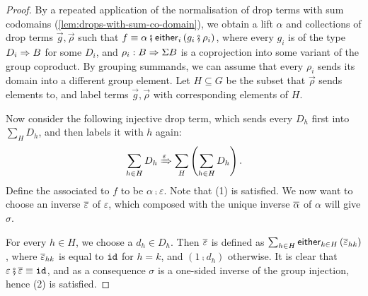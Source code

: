 \begin{proof}
    By a repeated application of the normalisation of drop terms with sum codomains (\cref{lem:drops-with-sum-co-domain}), we obtain a lift $\alpha$ and collections of drop terms $\vec g, \vec \rho$ such that $f \equiv \alpha \comp \eithermany{i}{(g_i \comp \rho_i)}$, where every $g_i$ is of the type $D_i \Rightarrow B$ for some $D_i$, and $\rho_i : B \Rightarrow \Sigma B$ is a coprojection into some variant of the group coproduct. By grouping summands, we can assume that every $\rho_i$ sends its domain into a different group element. Let $H \subseteq G$ be the subset that $\vec \rho$ sends elements to, and label terms $\vec g, \vec \rho$ with corresponding elements of $H$. 

    Now consider the following injective drop term, which sends every $D_h$ first into $\sum_H D_h$, and then labels it with $h$ again:
    \[
        \sum_{h \in H} D_h \xRightarrow{\varepsilon} \sum_H \left( \sum_{h \in H} D_h \right).
    \]  
    Define the  associated to $f$ to be $\alpha \comp \varepsilon$. Note that (1) is satisfied. We now want to choose an inverse $\overline \varepsilon$ of $\varepsilon$, which composed with the unique inverse $\overline \alpha$ of $\alpha$ will give $\sigma$. 
    
    For every $h \in H$, we choose a  $d_h \in D_h$. Then $\overline \varepsilon$ is defined as $\sum_{h \in H} \mathsf{either}_{k \in H}\, (\overline \varepsilon_{h k})$, where $\overline \varepsilon_{h k}$ is equal to $\mathtt{id}$ for $h = k$, and $(1\comp d_h)$ otherwise. It is clear that $\varepsilon \comp \inv \varepsilon \equiv \idterm$, and as a consequence $\sigma$ is a one-sided inverse of the group injection, hence (2) is satisfied.


\end{proof}
